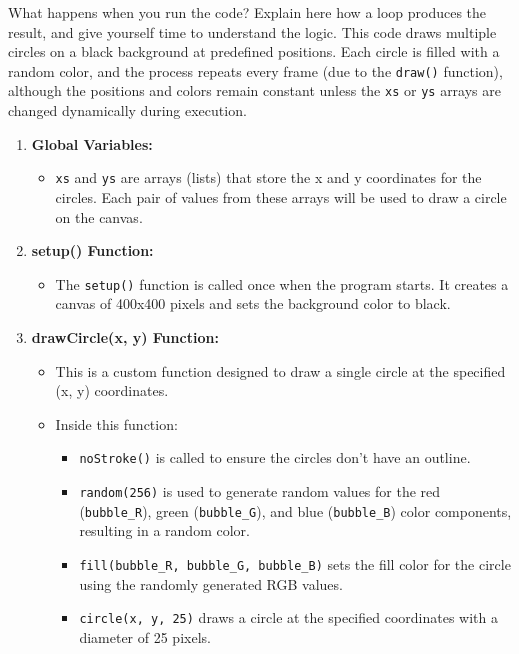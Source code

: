 \begin{exercisebox}[adjusted title= Explanation Loops I ]
What happens when you run the code? Explain here how a loop produces the result, and give yourself time to understand the logic. This code draws multiple circles on a black background at predefined positions. Each circle is filled with a random color, and the process repeats every frame (due to the \texttt{draw()} function), although the positions and colors remain constant unless the \texttt{xs} or \texttt{ys} arrays are changed dynamically during execution.

\begin{enumerate}
    \item \textbf{Global Variables:}
    \begin{itemize}
        \item \texttt{xs} and \texttt{ys} are arrays (lists) that store the x and y coordinates for the circles. Each pair of values from these arrays will be used to draw a circle on the canvas.
    \end{itemize}

    \item \textbf{setup() Function:}
    \begin{itemize}
        \item The \texttt{setup()} function is called once when the program starts. It creates a canvas of 400x400 pixels and sets the background color to black.
    \end{itemize}

    \item \textbf{drawCircle(x, y) Function:}
    \begin{itemize}
        \item This is a custom function designed to draw a single circle at the specified (x, y) coordinates.
        \item Inside this function:
        \begin{itemize}
            \item \texttt{noStroke()} is called to ensure the circles don't have an outline.
            \item \texttt{random(256)} is used to generate random values for the red (\texttt{bubble\_R}), green (\texttt{bubble\_G}), and blue (\texttt{bubble\_B}) color components, resulting in a random color.
            \item \texttt{fill(bubble\_R, bubble\_G, bubble\_B)} sets the fill color for the circle using the randomly generated RGB values.
            \item \texttt{circle(x, y, 25)} draws a circle at the specified coordinates with a diameter of 25 pixels.
        \end{itemize}
    \end{itemize}


\end{enumerate}
\end{exercisebox}
